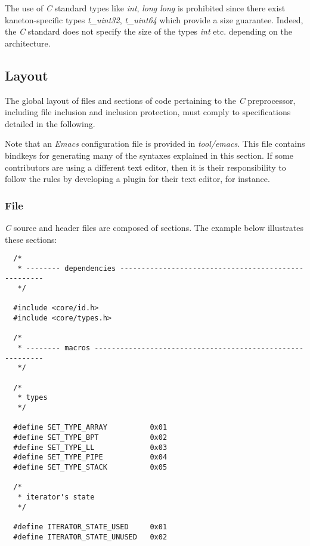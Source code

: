 The use of \textit{C} standard types like \textit{int}, \textit{long long}
is prohibited since there exist kaneton-specific types \textit{t\_uint32},
\textit{t\_uint64} which provide a size guarantee. Indeed, the \textit{C}
standard does not specify the size of the types \textit{int} etc. depending
on the architecture.

%
%

\subsection{Layout}

The global layout of files and sections of code pertaining to the \textit{C}
preprocessor, including file inclusion and inclusion protection, must
comply to specifications detailed in the following.

Note that an \textit{Emacs} configuration file is provided in
\textit{tool/emacs}. This file contains bindkeys for generating many of
the syntaxes explained in this section. If some contributors are using
a different text editor, then it is their responsibility to follow the rules
by developing a plugin for their text editor, for instance.


\subsubsection{File}

\textit{C} source and header files are composed of sections. The example
below illustrates these sections:

\begin{verbatim}
  /*
   * -------- dependencies ----------------------------------------------------
   */

  #include <core/id.h>
  #include <core/types.h>

  /*
   * -------- macros ----------------------------------------------------------
   */

  /*
   * types
   */

  #define SET_TYPE_ARRAY          0x01
  #define SET_TYPE_BPT            0x02
  #define SET_TYPE_LL             0x03
  #define SET_TYPE_PIPE           0x04
  #define SET_TYPE_STACK          0x05

  /*
   * iterator's state
   */

  #define ITERATOR_STATE_USED     0x01
  #define ITERATOR_STATE_UNUSED   0x02
\end{verbatim}

